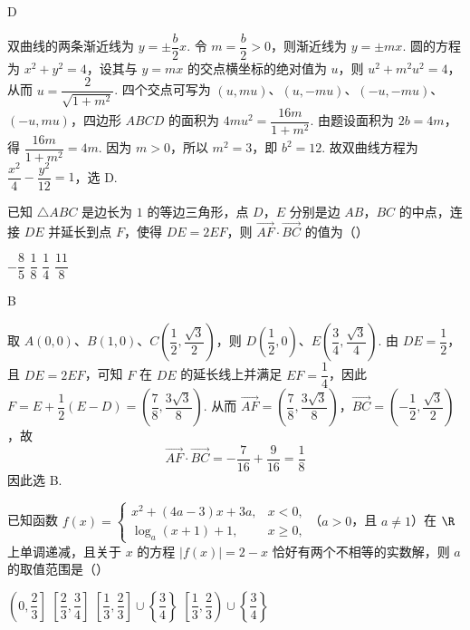 \begin{answer}
D
\end{answer}

\begin{solution}
双曲线的两条渐近线为 \(y=\pm\dfrac b2x\). 令 \(m=\dfrac b2>0\)，则渐近线为 \(y=\pm mx\). 圆的方程为 \(x^2+y^2=4\)，设其与 \(y=mx\) 的交点横坐标的绝对值为 \(u\)，则
\(u^2+m^2u^2=4\)，从而 \(u=\dfrac{2}{\sqrt{1+m^2}}\). 四个交点可写为 \((u,mu)\)、\((u,-mu)\)、\((-u,-mu)\)、\((-u,mu)\)，四边形 \(ABCD\) 的面积为
\(4mu^2=\dfrac{16m}{1+m^2}\). 由题设面积为 \(2b=4m\)，得
\(\dfrac{16m}{1+m^2}=4m\). 因为 \(m>0\)，所以 \(m^2=3\)，即 \(b^2=12\). 故双曲线方程为 \(\dfrac{x^2}{4}-\dfrac{y^2}{12}=1\)，选 D.
\end{solution}

\begin{problem}
已知 \(\triangle ABC\) 是边长为 \(1\) 的等边三角形，点 \(D\)，\(E\) 分别是边 \(AB\)，\(BC\) 的中点，连接 \(DE\) 并延长到点 \(F\)，使得 \(DE=2EF\)，则 \(\overrightarrow{AF}\cdot\overrightarrow{BC}\) 的值为（\quad）

\choices
    {\(-\dfrac85\)}
    {\(\dfrac18\)}
    {\(\dfrac14\)}
    {\(\dfrac{11}{8}\)}
\end{problem}

\begin{answer}
B
\end{answer}

\begin{solution}
取 \(A(0,0)\)、\(B(1,0)\)、\(C\left(\dfrac12,\dfrac{\sqrt3}{2}\right)\)，则
\(D\left(\dfrac12,0\right)\)、\(E\left(\dfrac34,\dfrac{\sqrt3}{4}\right)\). 由 \(DE=\dfrac12\)，且 \(DE=2EF\)，可知 \(F\) 在 \(DE\) 的延长线上并满足 \(EF=\dfrac14\)，因此
\(F=E+\dfrac12(E-D)=\left(\dfrac78,\dfrac{3\sqrt3}{8}\right)\). 从而
\(\overrightarrow{AF}=\left(\dfrac78,\dfrac{3\sqrt3}{8}\right)\)，\(\overrightarrow{BC}=\left(-\dfrac12,\dfrac{\sqrt3}{2}\right)\)，故
\[\overrightarrow{AF}\cdot\overrightarrow{BC}=-\dfrac7{16}+\dfrac{9}{16}=\dfrac18\]
因此选 B.
\end{solution}

\begin{problem}
已知函数 \(f(x)=\begin{cases}
x^2+(4a-3)x+3a,&x<0,\\
\log_a(x+1)+1,&x\ge 0,
\end{cases}\)（\(a>0\)，且 \(a\neq1\)）在 \(\R\) 上单调递减，且关于 \(x\) 的方程 \(\lvert f(x)\rvert=2-x\) 恰好有两个不相等的实数解，则 \(a\) 的取值范围是（\quad）

\choices
    {\(\left(0,\dfrac23\right]\)}
    {\(\left[\dfrac23,\dfrac34\right]\)}
    {\(\left[\dfrac13,\dfrac23\right]\cup\left\{\dfrac34\right\}\)}
    {\(\left[\dfrac13,\dfrac23\right)\cup\left\{\dfrac34\right\}\)}
\end{problem}

